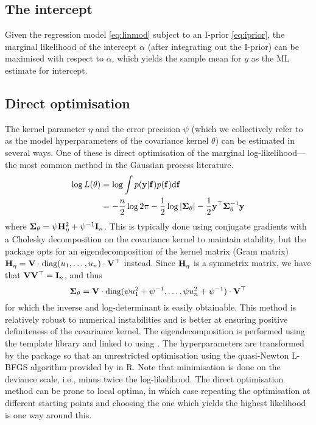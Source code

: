 
\subsection{The intercept}

Given the regression model \eqref{eq:linmod} subject to an I-prior \eqref{eq:iprior}, the marginal likelihood of the intercept $\alpha$ (after integrating out the I-prior) can be maximised with respect to $\alpha$, which yields the sample mean for $y$ as the ML estimate for intercept.

\subsection{Direct optimisation}

The kernel parameter $\eta$ and the error precision $\psi$ (which we collectively refer to as the model hyperparameters of the covariance kernel $\theta$) can be estimated in several ways.
One of these is direct optimisation of the marginal log-likelihood---the most common method in the Gaussian process literature.
%
\begin{align*}
  \log L(\theta)
  &= \log \int p(\by|\bff)p(\bff) \d \bff \\
  &= -\half[n]\log 2\pi - \half\log\vert \bSigma_\theta \vert - \half \by^\top \bSigma_\theta^{-1} \by
\end{align*}
%
where $\bSigma_\theta = \psi\bH_\eta^2 + \psi^{-1}\bI_n$.
This is typically done using conjugate gradients with a Cholesky decomposition on the covariance kernel to maintain stability, but the  package opts for an eigendecomposition of the kernel matrix (Gram matrix) $\bH_{\eta} = \bV\cdot\text{diag}(u_1,\dots,u_n)\cdot\bV^\top$ instead.
Since $\bH_{\eta}$ is a symmetrix matrix, we have that $\bV\bV^\top = \bI_n$, and thus
%
\[
  \bSigma_\theta = \bV \cdot \text{diag} (\psi u_1^2 + \psi^{-1},\dots,\psi u_n^2 + \psi^{-1}) \cdot \bV^\top
\]
%
for which the inverse and log-determinant is easily obtainable.
This method is relatively robust to numerical instabilities and is better at ensuring positive definiteness of the covariance kernel.
The eigendecomposition is performed using the   template library and linked to  using  \citep{eddelbuettel2011rcpp}.
The hyperparameters are transformed by the  package so that an unrestricted optimisation using the quasi-Newton L-BFGS algorithm provided by  in \proglang R.
Note that minimisation is done on the deviance scale, i.e., minus twice the log-likelihood.
The direct optimisation method can be prone to local optima, in which case repeating the optimisation at different starting points and choosing the one which yields the highest likelihood is one way around this.

